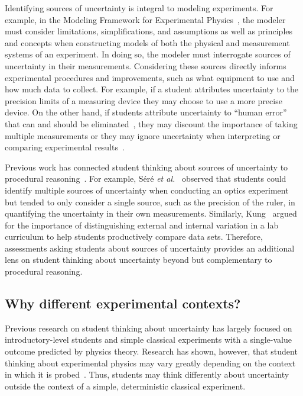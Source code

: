 \documentclass[english,aps,prstper,reprint,showpacs,longbibliography,superscriptaddress,nofootinbib]{revtex4-2}
\begin{document}
Identifying sources of uncertainty is integral to modeling experiments. For example, in the Modeling Framework for Experimental Physics~\cite{DounasFrazer2018,Zwickl2015}, the modeler must consider limitations, simplifications, and assumptions as well as principles and concepts when constructing models of both the physical and measurement systems of an experiment. In doing so, the modeler must interrogate sources of uncertainty in their measurements. Considering these sources directly informs experimental procedures and improvements, such as what equipment to use and how much data to collect. For example, if a student attributes uncertainty to the precision limits of a measuring device they may choose to use a more precise device. On the other hand, if students attribute uncertainty to ``human error'' that can and should be eliminated~\cite{Holmes2015,Hu2018,Sere2001,Hull2021}, they may discount the importance of taking multiple measurements or they may ignore uncertainty when interpreting or comparing experimental results~\cite{Pillay2008,Evangelinos2002}.

Previous work has connected student thinking about sources of uncertainty to procedural reasoning~\cite{Etkina2008,Sere1993,Kung2005,Holmes2015}. For example, S\'{e}r\'{e} \textit{et al.}~\cite{Sere1993} observed that students could identify multiple sources of uncertainty when conducting an optics experiment but tended to only consider a single source, such as the precision of the ruler, in quantifying the uncertainty in their own measurements. Similarly, Kung~\cite{Kung2005} argued for the importance of distinguishing external and internal variation in a lab curriculum to help students productively compare data sets. Therefore, assessments asking students about sources of uncertainty provides an additional lens on student thinking about uncertainty beyond but complementary to procedural reasoning.  

\subsection{Why different experimental contexts?}
\label{sec:variables}

Previous research on student thinking about uncertainty has largely focused on introductory-level students and simple classical experiments with a single-value outcome predicted by physics theory. Research has shown, however, that student thinking about experimental physics may vary greatly depending on the context in which it is probed~\cite{Leach2000}. Thus, students may think differently about uncertainty outside the context of a simple, deterministic classical experiment.
\end{document}
